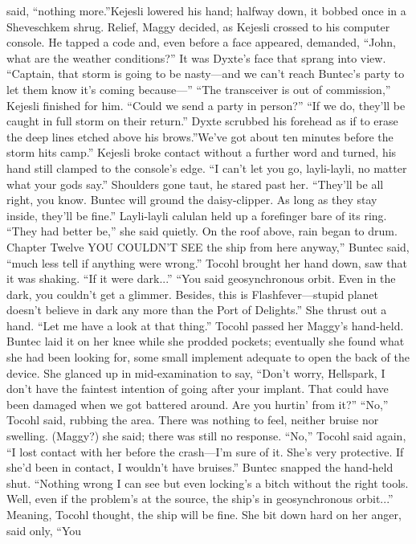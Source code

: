 \documentclass[9pt]{article}
\begin{document}
said, “nothing more.”Kejesli lowered his hand; halfway down, it bobbed once in a Sheveschkem shrug. Relief, Maggy
decided, as Kejesli crossed to his computer console. He tapped a code and, even before a face
appeared, demanded, “John, what are the weather conditions?”
It was Dyxte’s face that sprang into view. “Captain, that storm is going to be nasty—and we can’t
reach Buntec’s party to let them know it’s coming because—”
“The transceiver is out of commission,” Kejesli finished for him. “Could we send a party in person?”
“If we do, they’ll be caught in full storm on their return.” Dyxte scrubbed his forehead as if to erase
the deep lines etched above his brows.”We’ve got about ten minutes before the storm hits camp.”
Kejesli broke contact without a further word and turned, his hand still clamped to the console’s edge.
“I can’t let you go, layli-layli, no matter what your gods say.” Shoulders gone taut, he stared past her.
“They’ll be all right, you know. Buntec will ground the daisy-clipper. As long as they stay inside, they’ll
be fine.”
Layli-layli calulan held up a forefinger bare of its ring. “They had better be,” she said quietly. On the
roof above, rain began to drum.
Chapter Twelve
YOU COULDN’T SEE the ship from here anyway,” Buntec said, “much less tell if anything were
wrong.”
Tocohl brought her hand down, saw that it was shaking. “If it were dark...”
“You said geosynchronous orbit. Even in the dark, you couldn’t get a glimmer. Besides, this is
Flashfever—stupid planet doesn’t believe in dark any more than the Port of Delights.” She thrust out a
hand. “Let me have a look at that thing.”
Tocohl passed her Maggy’s hand-held. Buntec laid it on her knee while she prodded pockets;
eventually she found what she had been looking for, some small implement adequate to open the back of
the device. She glanced up in mid-examination to say, “Don’t worry, Hellspark, I don’t have the faintest
intention of going after your implant. That could have been damaged when we got battered around. Are
you hurtin’ from it?”
“No,” Tocohl said, rubbing the area. There was nothing to feel, neither bruise nor swelling. (Maggy?)
she said; there was still no response. “No,” Tocohl said again, “I lost contact with her before the
crash—I’m sure of it. She’s very protective. If she’d been in contact, I wouldn’t have bruises.”
Buntec snapped the hand-held shut. “Nothing wrong I can see but even locking’s a bitch without the
right tools. Well, even if the problem’s at the source, the ship’s in geosynchronous orbit...”
Meaning, Tocohl thought, the ship will be fine. She bit down hard on her anger, said only, “You
\end{document}
